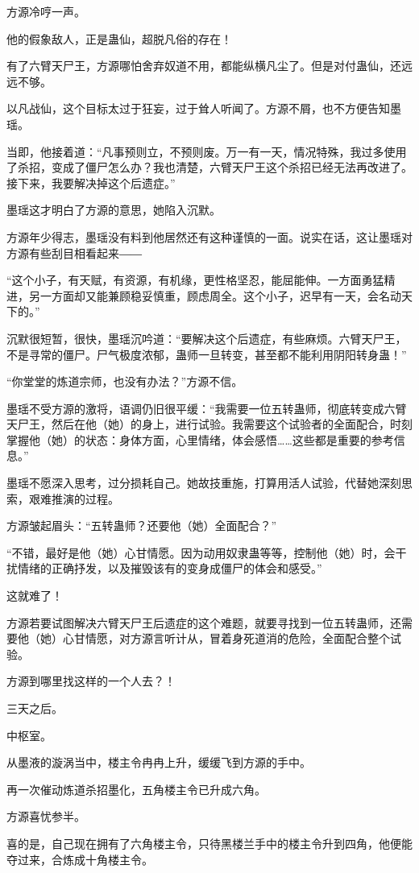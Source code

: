\begin{this_body}
方源冷哼一声。

他的假象敌人，正是蛊仙，超脱凡俗的存在！

有了六臂天尸王，方源哪怕舍弃奴道不用，都能纵横凡尘了。但是对付蛊仙，还远远不够。

以凡战仙，这个目标太过于狂妄，过于耸人听闻了。方源不屑，也不方便告知墨瑶。

当即，他接着道：“凡事预则立，不预则废。万一有一天，情况特殊，我过多使用了杀招，变成了僵尸怎么办？我也清楚，六臂天尸王这个杀招已经无法再改进了。接下来，我要解决掉这个后遗症。”

墨瑶这才明白了方源的意思，她陷入沉默。

方源年少得志，墨瑶没有料到他居然还有这种谨慎的一面。说实在话，这让墨瑶对方源有些刮目相看起来――

“这个小子，有天赋，有资源，有机缘，更性格坚忍，能屈能伸。一方面勇猛精进，另一方面却又能兼顾稳妥慎重，顾虑周全。这个小子，迟早有一天，会名动天下的。”

沉默很短暂，很快，墨瑶沉吟道：“要解决这个后遗症，有些麻烦。六臂天尸王，不是寻常的僵尸。尸气极度浓郁，蛊师一旦转变，甚至都不能利用阴阳转身蛊！”

“你堂堂的炼道宗师，也没有办法？”方源不信。

墨瑶不受方源的激将，语调仍旧很平缓：“我需要一位五转蛊师，彻底转变成六臂天尸王，然后在他（她）的身上，进行试验。我需要这个试验者的全面配合，时刻掌握他（她）的状态：身体方面，心里情绪，体会感悟……这些都是重要的参考信息。”

墨瑶不愿深入思考，过分损耗自己。她故技重施，打算用活人试验，代替她深刻思索，艰难推演的过程。

方源皱起眉头：“五转蛊师？还要他（她）全面配合？”

“不错，最好是他（她）心甘情愿。因为动用奴隶蛊等等，控制他（她）时，会干扰情绪的正确抒发，以及摧毁该有的变身成僵尸的体会和感受。”

这就难了！

方源若要试图解决六臂天尸王后遗症的这个难题，就要寻找到一位五转蛊师，还需要他（她）心甘情愿，对方源言听计从，冒着身死道消的危险，全面配合整个试验。

方源到哪里找这样的一个人去？！

三天之后。

中枢室。

从墨液的漩涡当中，楼主令冉冉上升，缓缓飞到方源的手中。

再一次催动炼道杀招墨化，五角楼主令已升成六角。

方源喜忧参半。

喜的是，自己现在拥有了六角楼主令，只待黑楼兰手中的楼主令升到四角，他便能夺过来，合炼成十角楼主令。


\end{this_body}
